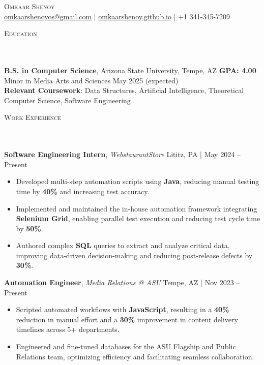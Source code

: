 \documentclass[10pt, letterpaper]{article}
\newcommand{\lineunder} {
    \vspace*{-4pt} \\ %
    \hspace*{-15pt} \hrulefill \\
}
\newcommand{\header}[1] {
    {\textsc{\small #1}}
    \lineunder %
}
\begin{document}
\begin{center}
  {\LARGE \scshape Omkaar Shenoy}\\
  \vspace{0.5mm}
  \small{
    \href{mailto:omkaarshenoyos@gmail.com}{omkaarshenoyos@gmail.com} | 
    \href{https://omkaarshenoy.github.io}{omkaarshenoy.github.io} | 
    +1 341-345-7209
  }
\end{center}

\header{Education}
\textbf{B.S. in Computer Science}, Arizona State University, Tempe, AZ \hfill \textbf{GPA: 4.00} \\
Minor in Media Arts and Sciences \hfill May 2025 (expected) \\
\textbf{Relevant Coursework}: Data Structures, Artificial Intelligence, Theoretical Computer Science, Software Engineering

\header{Work Experience}
\textbf{Software Engineering Intern}, \textit{WebstaurantStore} \hfill Lititz, PA | May 2024 – Present
\begin{itemize}
    \item Developed multi-step automation scripts using \textbf{Java}, reducing manual testing time by \textbf{40\%} and increasing test accuracy.
    \item Implemented and maintained the in-house automation framework integrating \textbf{Selenium Grid}, enabling parallel test execution and reducing test cycle time by \textbf{50\%}.
    \item Authored complex \textbf{SQL} queries to extract and analyze critical data, improving data-driven decision-making and reducing post-release defects by \textbf{30\%}.
\end{itemize}

\textbf{Automation Engineer}, \textit{Media Relations @ ASU} \hfill Tempe, AZ | Nov 2023 – Present
\begin{itemize}
    \item Scripted automated workflows with \textbf{JavaScript}, resulting in a \textbf{40\%} reduction in manual effort and a \textbf{30\%} improvement in content delivery timelines across 5+ departments.
    \item Engineered and fine-tuned databases for the ASU Flagship and Public Relations team, optimizing efficiency and facilitating seamless collaboration.
\end{itemize}
\end{document}
